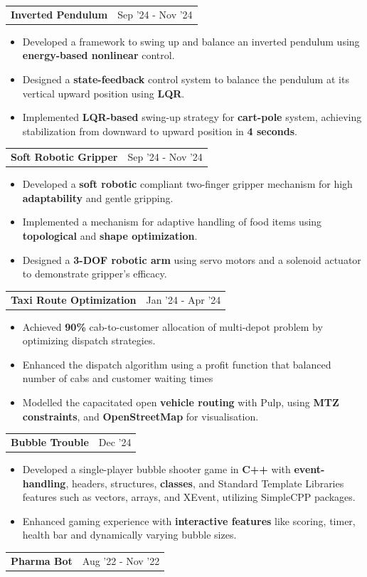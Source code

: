 \documentclass[letterpaper,11pt]{article}
\makeatletter
\newcommand{\resumeItem}[1]{
  \item\small{
    {#1 \vspace{-2pt}}
  }
}
\newcommand{\resumeProjectHeading}[2]{
    \vspace{-2pt}\item
    \begin{tabular*}{0.97\textwidth}{l@{\extracolsep{\fill}}r}
      \small#1 & #2 \\
    \end{tabular*}\vspace{-7pt}
}
\newcommand{\resumeItemListStart}{\begin{itemize}}
\newcommand{\resumeItemListEnd}{\end{itemize}\vspace{-5pt}}
\makeatother
\begin{document}
      \resumeProjectHeading
        {\textbf{Inverted Pendulum}}{Sep '24 - Nov '24}
          \resumeItemListStart
            \resumeItem{Developed a framework to swing up and balance an inverted pendulum using \textbf{energy-based nonlinear} control.}
            \resumeItem{Designed a \textbf{state-feedback} control system to balance the pendulum at its vertical upward position using \textbf{LQR}.}
            \resumeItem{Implemented \textbf{LQR-based} swing-up strategy for \textbf{cart-pole} system, achieving stabilization from downward to upward position in\textbf{ 4 seconds}.}
          \resumeItemListEnd
        \resumeProjectHeading
        {\textbf{Soft Robotic Gripper }\href{https://github.com/prachitgupta/Soft-end-effector.git}{\textcolor{blue}\faGithub}}{Sep '24 - Nov '24}
          \resumeItemListStart
            \resumeItem{ Developed a \textbf{soft robotic} compliant two-finger gripper mechanism for high \textbf{adaptability} and gentle gripping. }
            \resumeItem{Implemented a mechanism for adaptive handling of food items using \textbf{topological} and \textbf{shape optimization}.}
            \resumeItem{Designed a \textbf{3-DOF robotic arm} using servo motors and a solenoid actuator to demonstrate gripper's efficacy.}
          \resumeItemListEnd
        \resumeProjectHeading
        {\textbf{Taxi Route Optimization}}{Jan ’24 - Apr ’24}
          \resumeItemListStart
            \resumeItem{ Achieved\textbf{ 90\%} cab-to-customer allocation of multi-depot problem by optimizing dispatch strategies. }
            \resumeItem{Enhanced the dispatch algorithm using a profit function that balanced number of cabs and customer waiting times}
            \resumeItem{Modelled the capacitated open \textbf{vehicle routing} with Pulp, using \textbf{MTZ constraints}, and \textbf{OpenStreetMap} for visualisation.}
          \resumeItemListEnd
        \resumeProjectHeading
        {\textbf{Bubble Trouble} \href{https://github.com/prachitgupta/Bubble-Trouble.git}{\textcolor{blue}\faGithub}}{Dec ’24}
          \resumeItemListStart
            \resumeItem{ Developed a single-player bubble shooter game in \textbf{C++} with \textbf{event-handling}, headers, structures, \textbf{classes}, and Standard
            Template Libraries features such as vectors, arrays, and XEvent, utilizing SimpleCPP packages.}
            \resumeItem{Enhanced gaming experience with \textbf{interactive features} like scoring, timer, health bar and dynamically varying bubble sizes.}
          \resumeItemListEnd
        \resumeProjectHeading
        {\textbf{Pharma Bot}}{Aug ’22 - Nov ’22}
\end{document}
